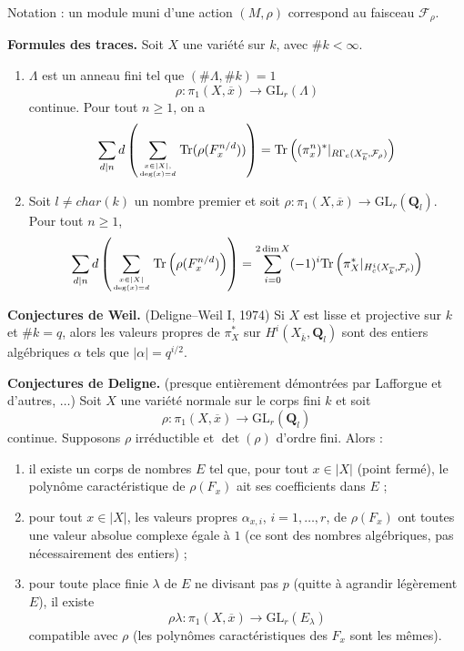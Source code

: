 \noindent
Notation : un module muni d'une action $(M, \rho)$ correspond au faisceau
$\mathcal{F}_\rho$.

\medskip\noindent
{\bf Formules des traces.} Soit $X$ une variété sur $k$, avec $\# k < \infty$.
\begin{enumerate}
\item $\Lambda$ est un anneau fini tel que $(\# \Lambda, \# k)=1$
$$
\rho : \pi_1(X, \overline{x})\to \text{GL}_r(\Lambda)
$$
continue. Pour tout $n\geq 1$, on a
$$
\sum_{d|n}d\left(
\sum_{x\in |X|, \atop \deg(x)=d}
\text{Tr}(\rho(F_x^{n/d}))\right) =
\text{Tr}\left(
(\pi_x^n)^* |_{R\Gamma_c(X_{\overline{k}}, \mathcal{F}_\rho)}\right)
$$
\item Soit $l\neq char(k)$ un nombre premier et soit $\rho : \pi_1(X, \overline{x})\to
\text{GL}_r(\mathbf{Q}_l)$. Pour tout $n\geq 1$,
$$
\sum_{d|n} d\left(
\sum_{x\in |X| \atop \deg(x)=d}
\text{Tr}
\left(
\rho(F_x^{n/d})
\right)
\right) =
\sum_{i = 0}^{2\dim X}
(-1)^i
\text{Tr}\left(
\pi_X^* |_{H_c^i(X_{\overline{k}}, \mathcal{F}_\rho)}\right)
$$
\end{enumerate}

\noindent
{\bf Conjectures de Weil.} (Deligne--Weil I, 1974) Si $X$ est lisse et projective sur $k$ et
$\# k = q$, alors les valeurs propres de $\pi_X^*$ sur $H^i(X_{\overline{k}},
\mathbf{Q}_l)$ sont des entiers algébriques $\alpha$ tels que $|\alpha|=q^{i/2}$.

\medskip\noindent
{\bf Conjectures de Deligne.} (presque entièrement démontrées par
Lafforgue et d'autres, $\ldots$) Soit $X$ une variété normale sur le corps fini $k$ et soit
$$
\rho : \pi_1(X, \overline{x}) \longrightarrow \text{GL}_r(\mathbf{Q}_l)
$$
continue. Supposons $\rho$ irréductible et $\det(\rho)$ d'ordre fini. Alors :
\begin{enumerate}
\item il existe un corps de nombres $E$ tel que, pour tout $x\in
|X|$ (point fermé), le polynôme caractéristique de $\rho(F_x)$ ait ses coefficients dans $E$ ;
\item pour tout $x\in |X|$, les valeurs propres $\alpha_{x, i}$, $i = 1, \ldots,
r$, de $\rho(F_x)$ ont toutes une valeur absolue complexe égale à $1$
(ce sont des nombres algébriques, pas nécessairement des entiers) ;
\item pour toute place finie $\lambda$ de $E$ ne divisant pas $p$
(quitte à agrandir légèrement $E$), il existe
$$
\rho\lambda : \pi_1(X, \overline{x}) \to \text{GL}_r(E_\lambda)
$$
compatible avec $\rho$ (les polynômes caractéristiques des $F_x$ sont les mêmes).
\end{enumerate}

